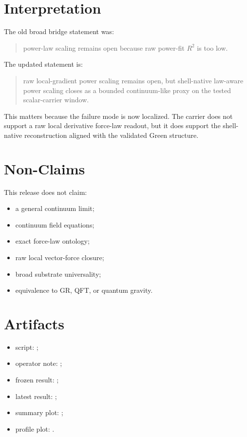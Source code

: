 \documentclass[11pt]{article}
\begin{document}
\section{Interpretation}

The old broad bridge statement was:
\begin{quote}
power-law scaling remains open because raw power-fit \(R^2\) is too low.
\end{quote}

The updated statement is:
\begin{quote}
raw local-gradient power scaling remains open, but shell-native law-aware power scaling closes as a bounded continuum-like proxy on the tested scalar-carrier window.
\end{quote}

This matters because the failure mode is now localized. The carrier does not support a raw local derivative force-law readout, but it does support the shell-native reconstruction aligned with the validated Green structure.

\section{Non-Claims}

This release does not claim:
\begin{itemize}
\item a general continuum limit;
\item continuum field equations;
\item exact force-law ontology;
\item raw local vector-force closure;
\item broad substrate universality;
\item equivalence to GR, QFT, or quantum gravity.
\end{itemize}

\section{Artifacts}

\begin{itemize}
\item script: ;
\item operator note: ;
\item frozen result: ;
\item latest result: ;
\item summary plot: ;
\item profile plot: .
\end{itemize}
\end{document}
